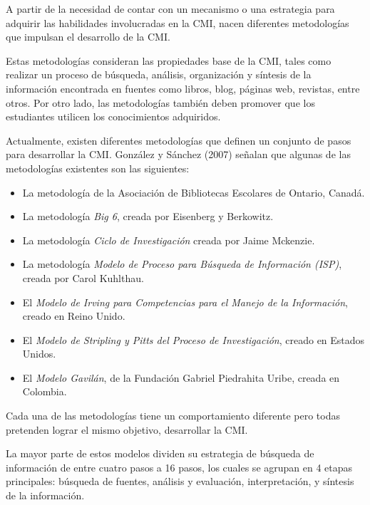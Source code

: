 A partir de la necesidad de contar con un mecanismo o una estrategia para adquirir las habilidades involucradas en la CMI, nacen diferentes metodologías que impulsan el desarrollo de la CMI. 

Estas metodologías consideran las propiedades base de la CMI, tales como realizar un proceso de búsqueda, análisis, organización y síntesis de la información encontrada en fuentes como libros, blog, páginas web, revistas, entre otros. Por otro lado, las metodologías también deben promover que los estudiantes utilicen  los conocimientos adquiridos.

Actualmente, existen diferentes metodologías que definen un conjunto de pasos para desarrollar la CMI. González y Sánchez (2007) señalan que algunas de las metodologías existentes son las siguientes:

\begin{itemize}
  \item La metodología de la Asociación de Bibliotecas Escolares de Ontario, Canadá.
  \item La metodología \textit{Big 6}, creada por Eisenberg y Berkowitz.
  \item La metodología \textit{Ciclo de Investigación} creada por Jaime Mckenzie.
  \item La metodología \textit{Modelo de Proceso para Búsqueda de Información (ISP)}, creada por Carol Kuhlthau.
  \item El \textit{Modelo de Irving para Competencias para el Manejo de la Información}, creado en Reino Unido.
  \item El \textit{Modelo de Stripling y Pitts del Proceso de Investigación}, creado en Estados Unidos.
  \item El \textit{Modelo Gavilán}, de la Fundación Gabriel Piedrahita Uribe, creada en Colombia.
\end{itemize}

Cada una de las metodologías tiene un comportamiento diferente pero todas pretenden lograr el mismo objetivo, desarrollar la CMI.
 
La mayor parte de estos modelos dividen su estrategia de búsqueda de información de entre cuatro pasos a 16 pasos, los cuales se agrupan en 4 etapas principales: búsqueda de fuentes, análisis y evaluación, interpretación, y síntesis de la información.


